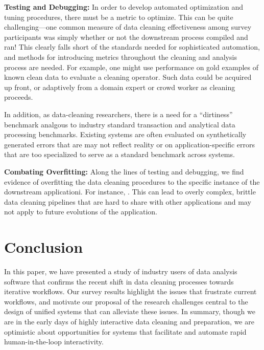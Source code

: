 \vspace{0.5em}
\noindent\textbf{Testing and Debugging:} In order to develop automated optimization and tuning procedures, there must be a metric to optimize.  This can be quite challenging---one common measure of data cleaning effectiveness among survey participants was simply whether or not the downstream process compiled and ran!
This clearly falls short of the standards needed for sophisticated automation, and methods for introducing metrics throughout the cleaning and analysis process are needed.
For example, one might use performance on gold examples of known clean data to evaluate a cleaning operator.
Such data could be acquired up front, or adaptively from a domain expert or crowd worker as cleaning proceeds.

In addition, as data-cleaning researchers, there is a need for a ``dirtiness'' benchmark analgous to industry standard transaction and analytical data processing benchmarks.
Existing systems are often evaluated on synthetically generated errors that are may not reflect reality or on application-specific errors that are too specialized to serve as a standard benchmark across systems.

\vspace{0.5em}
\noindent\textbf{Combating Overfitting:}  Along the lines of testing and debugging, we find evidence of overfitting the data cleaning procedures to the specific instance of the downstream applicationi.  For instance, {\color{red}{EXAMPLE}}.  This can lead to overly complex, brittle data cleaning pipelines that are hard to share with other applications and may not apply to future evolutions of the application.  {\color{red}{APPLY SANJAY}}

\section{Conclusion}
In this paper, we have presented a study of industry users of data analysis software that confirms the recent shift in data cleaning processes towards iterative workflows.
Our survey results highlight the issues that frustrate current workflows, and motivate our proposal of the research challenges central to the design of unified systems that can alleviate these issues.
In summary, though we are in the early days of highly interactive data cleaning and preparation, we are optimistic about opportunities for systems that facilitate and automate rapid human-in-the-loop interactivity.


